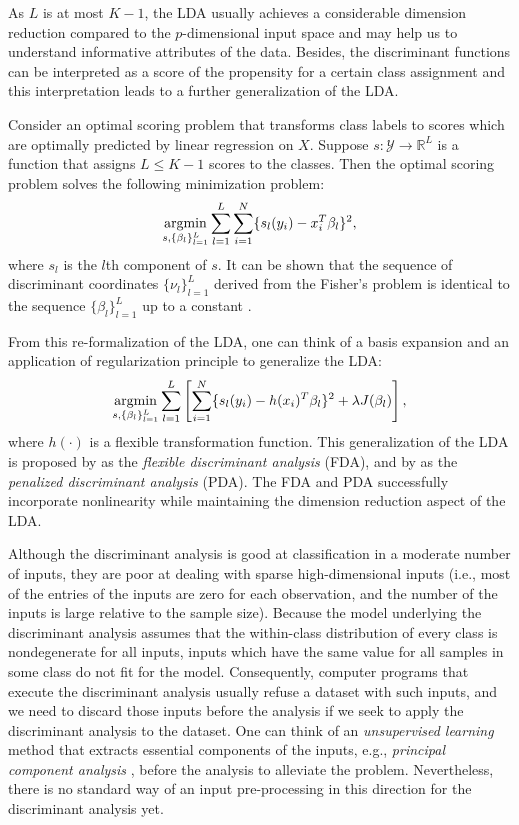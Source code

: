 \documentclass[12pt]{article}
\newcommand{\argmin}{\mathop{\rm argmin}\limits}
\begin{document}
As $L$ is at most $K-1$, the LDA usually achieves a considerable dimension reduction compared to the $p$-dimensional input space and may help us to understand informative attributes of the data. Besides, the discriminant functions can be interpreted as a score of the propensity for a certain class assignment and this interpretation leads to a further generalization of the LDA.

Consider an optimal scoring problem that transforms class labels to scores which are optimally predicted by linear regression on $X$. Suppose $s: \mathcal{Y} \rightarrow \mathbb{R}^L$ is a function that assigns $L \leq K-1$ scores to the classes. Then the optimal scoring problem solves the following minimization problem:
\begin{equation*}
\argmin_{s, \{\beta_l\}_{l=1}^L} \sum_{l=1}^L \sum_{i=1}^N \{s_l(y_i) - x_i^T \beta_l\}^2,
\end{equation*}
where $s_l$ is the $l$th component of $s$. It can be shown that the sequence of discriminant coordinates $\{\nu_l\}_{l=1}^L$ derived from the Fisher's problem is identical to the sequence $\{\beta_l\}_{l=1}^L$ up to a constant \parencite{Mardia1979}.

From this re-formalization of the LDA, one can think of a basis expansion and an application of regularization principle to generalize the LDA:
\begin{equation*}
\argmin_{s, \{\beta_l\}_{l=1}^L} \sum_{l=1}^L \left[ \sum_{i=1}^N \{s_l(y_i) - h(x_i)^T \beta_l\}^2 + \lambda J(\beta_l) \right],
\end{equation*}
where $h(\cdot)$ is a flexible transformation function. This generalization of the LDA is proposed by \textcite{Hastie1994} as the {\it flexible discriminant analysis} (FDA), and by \textcite{Hastie1995} as the {\it penalized discriminant analysis} (PDA). The FDA and PDA successfully incorporate nonlinearity while maintaining the dimension reduction aspect of the LDA.

Although the discriminant analysis is good at classification in a moderate number of inputs, they are poor at dealing with sparse high-dimensional inputs (i.e., most of the entries of the inputs are zero for each observation, and the number of the inputs is large relative to the sample size). Because the model underlying the discriminant analysis assumes that the within-class distribution of every class is nondegenerate for all inputs, inputs which have the same value for all samples in some class do not fit for the model. Consequently, computer programs that execute the discriminant analysis usually refuse a dataset with such inputs, and we need to discard those inputs before the analysis if we seek to apply the discriminant analysis to the dataset. One can think of an {\it unsupervised learning} method that extracts essential components of the inputs, e.g., {\it principal component analysis} \parencite{Mardia1979}, before the analysis to alleviate the problem. Nevertheless, there is no standard way of an input pre-processing in this direction for the discriminant analysis yet.
\end{document}
